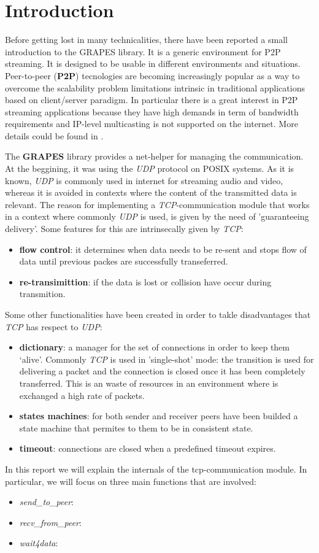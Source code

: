 \section{Introduction}
\label{ch:intro}
Before getting lost in many technicalities, there have been reported a small
introduction to the GRAPES library. It is a generic environment for P2P
streaming. It is designed to be usable in different environments and
situations. Peer-to-peer (\textbf{P2P}) tecnologies are becoming increasingly
popular as a way to overcome the scalability problem limitations intrinsic in
traditional applications based on client/server paradigm. In particular there
is a great interest in P2P streaming applications because they have high
demands in term of bandwidth requirements and IP-level multicasting is not
supported on the internet.
More details could be found in \cite{disi10-038}.

The \textbf{GRAPES} library provides a net-helper for managing the
communication. At the beggining, it was using the \textit{UDP} protocol on POSIX
systems. As it is known, \textit{UDP} is commonly used in internet for streaming audio and video,
whereas it is avoided in contexts where the content of the transmitted data is relevant.
The reason for implementing a \textit{TCP}-communication module that works in a context where
commonly \textit{UDP} is used, is given by the need of 'guaranteeing delivery'.
Some features for this are intrinsecally given by \textit{TCP}:
\begin{itemize}
\item \textbf{flow control}: it determines when data needs to be re-sent and stops flow of data until
  previous packes are successfully transeferred.
\item \textbf{re-transimittion}: if the data is lost or collision have occur during transmition.
\end{itemize}
Some other functionalities have been created in order to takle disadvantages that \textit{TCP} has
respect to \textit{UDP}:
\begin{itemize}
\item \textbf{dictionary}: a manager for the set of connections in order to keep them `alive'.
                          Commonly \textit{TCP} is used in 'single-shot' mode: the transition is
                          used for delivering a packet and the connection is closed once it has
                          been completely transferred. This is an waste of resources in an
                          environment where is exchanged a high rate of packets.
\item \textbf{states machines}: for both sender and receiver peers have been builded a state machine
                                that permites to them to be in consistent state.
\item \textbf{timeout}: connections are closed when a predefined timeout expires.
\end{itemize}

In this report we will explain the internals of the tcp-communication module.
In particular, we will focus on three main functions that are involved:
\begin{itemize}
  \item \textit{send\_to\_peer}:
  \item \textit{recv\_from\_peer}:
  \item \textit{wait4data}:
\end{itemize}

